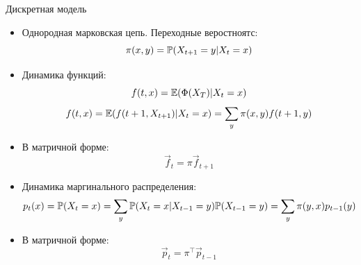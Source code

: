 \documentclass[aspectratio=169]{beamer}
\begin{document}
\begin{frame}{Дискретная модель}
    \begin{itemize}
        \item Однородная марковская цепь. Переходные веростноятс:
        $$
            \pi(x, y) = \mathbb{P} (X_{t + 1} = y | X_{t} = x)
        $$
        \item Динамика функций:
        $$
            f(t, x) = \mathbb{E} (\Phi(X_T) | X_t = x)
        $$
        $$
            f(t, x) = \mathbb{E} (f(t+1, X_{t+1}) | X_t = x) = \sum_y \pi(x, y) f(t+1, y)
        $$
        \item В матричной форме:
        $$
            \vec{f}_t = \pi \vec{f}_{t+1}
        $$

        \item Динамика маргинального распределения:
        $$
            p_t(x) = \mathbb{P} (X_t = x) = \sum_y \mathbb{P} (X_t = x | X_{t-1} = y) \mathbb{P}(X_{t-1}=y) = \sum_y \pi(y, x) p_{t-1}(y)
        $$
        \item В матричной форме:
        $$
            \vec{p}_t = \pi^{\top} \vec{p}_{t-1}
        $$
    \end{itemize}
\end{frame}
\end{document}
